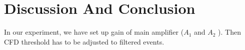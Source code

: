 \section{Discussion And Conclusion}
In our experiment, we have set up gain of main amplifier ($ A_{1} $ and $ A_{2} $ ). Then CFD threshold has to be adjusted to filtered events. 